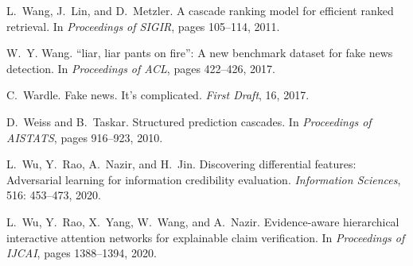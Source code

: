 \documentclass[11pt]{article}
\begin{document}
\begin{thebibliography}{10}
\begin{small}
L.~Wang, J.~Lin, and D.~Metzler.
\newblock A cascade ranking model for efficient ranked retrieval.
\newblock In \emph{Proceedings of SIGIR}, pages 105--114, 2011.

W.~Y. Wang.
\newblock “liar, liar pants on fire”: A new benchmark dataset for fake news
detection.
\newblock In \emph{Proceedings of ACL}, pages 422--426, 2017.

C.~Wardle.
\newblock Fake news. {I}t’s complicated.
\newblock \emph{First Draft}, 16, 2017.

D.~Weiss and B.~Taskar.
\newblock Structured prediction cascades.
\newblock In \emph{Proceedings of AISTATS}, pages 916--923, 2010.

L.~Wu, Y.~Rao, A.~Nazir, and H.~Jin.
\newblock Discovering differential features: Adversarial learning for
information credibility evaluation.
\newblock \emph{Information Sciences}, 516: 453--473,
2020{}.

L.~Wu, Y.~Rao, X.~Yang, W.~Wang, and A.~Nazir.
\newblock Evidence-aware hierarchical interactive attention networks for
explainable claim verification.
\newblock In \emph{Proceedings of IJCAI}, pages 1388--1394, 2020{}.
\end{small}
\end{thebibliography}
\end{document}
